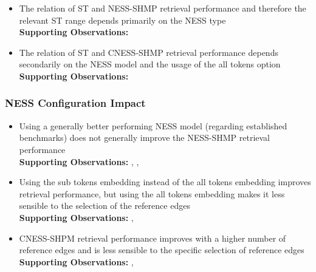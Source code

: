 \documentclass[11pt]{scrreprt}
\begin{document}
\begin{itemize}

\item The relation of ST and NESS-SHMP retrieval performance and therefore the relevant ST range depends primarily on the NESS type \\
\textbf{Supporting Observations:}   

\item The relation of ST and CNESS-SHMP retrieval performance depends secondarily on the NESS model and the usage of the all tokens option \\
\textbf{Supporting Observations:}   

\end{itemize}


\subsubsection{NESS Configuration Impact}

\begin{itemize}

\item Using a generally better performing NESS model (regarding established benchmarks) does not generally improve the NESS-SHMP retrieval performance \\
\textbf{Supporting Observations:} , , 

\item Using the sub tokens embedding instead of the all tokens embedding improves retrieval performance, but using the all tokens embedding makes it less sensible to the selection of the reference edges
\\ \textbf{Supporting Observations:} , 

\item CNESS-SHPM retrieval performance improves with a higher number of reference edges and is less sensible to the specific selection of reference edges
\\ \textbf{Supporting Observations:} , 

\end{itemize}
\end{document}
